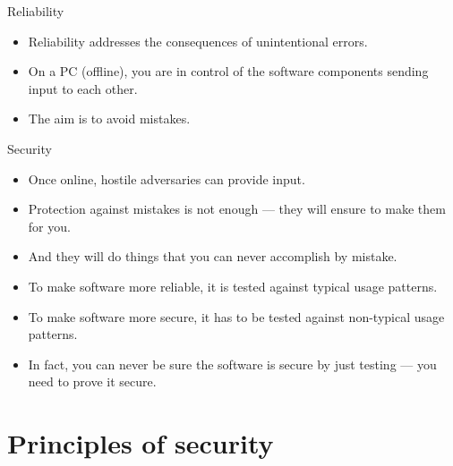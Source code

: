 \documentclass{beamer}
\begin{document}
\begin{frame}
  \begin{block}{Reliability}
    \begin{itemize}
      \item Reliability addresses the consequences of unintentional errors.

      \item On a PC (offline), you are in control of the software components 
        sending input to each other.

      \item The aim is to avoid mistakes.
    \end{itemize}
  \end{block}

  \pause{}

  \begin{block}{Security}
    \begin{itemize}
      \item Once online, hostile adversaries can provide input.

      \item Protection against mistakes is not enough --- they will ensure to 
        make them for you.

      \item And they will do things that you can never accomplish by mistake.
    \end{itemize}
  \end{block}
\end{frame}

\begin{frame}
  \begin{itemize}
    \item To make software more reliable, it is tested against typical usage 
      patterns.

    \item To make software more secure, it has to be tested against non-typical 
      usage patterns.

    \item In fact, you can never be sure the software is secure by just testing 
      --- you need to prove it secure.
  \end{itemize}
\end{frame}


\section{Principles of security}
\end{document}
